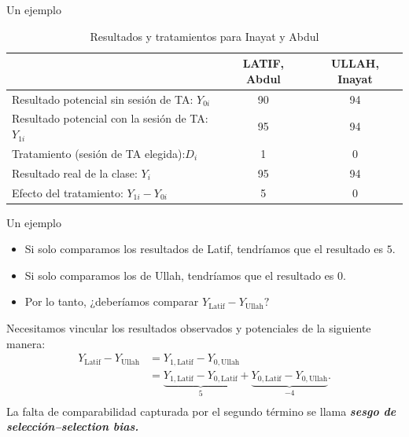 \documentclass[11pt, aspectratio=169, compress]{beamer}
\begin{document}
\begin{frame}{Un ejemplo}
  \begin{table}[H]
  \centering 
    \begin{threeparttable}
    \caption{Resultados y tratamientos para Inayat y Abdul}
    \small 
    \begin{tabular}{l c c} \hline \hline 
                              &LATIF, Abdul 	& ULLAH, Inayat \\ \hline
    Resultado potencial sin sesión de TA: $ Y_{0i} $	& 90	& 94  	\\
    Resultado potencial con la sesión de TA: $ Y_{1i}$ 	& 95	& 94  	\\
    Tratamiento (sesión de TA elegida):$ D_i $			& 1		& 0 	\\
    Resultado real de la clase: $ Y_{i} $				& 95	& 94   	\\ 
    Efecto del tratamiento: $ Y_{1i} - Y_{0i} $			& 5		& 0  	\\ \hline 
    \end{tabular}
    \end{threeparttable}
  \end{table}
\end{frame}
\begin{frame}{Un ejemplo}
\begin{itemize}
\item Si solo comparamos los resultados de Latif, tendríamos que el resultado es $ 5 $. 
\item Si solo comparamos los de Ullah, tendríamos que el resultado es $ 0 $.
\item Por lo tanto, ¿deberíamos comparar $ Y_{\mathrm{Latif}} - Y_{\mathrm{Ullah}} ? $
\end{itemize}

Necesitamos vincular los resultados observados y potenciales de la siguiente manera:
\begin{align*}
Y_{\mathrm{Latif}} - Y_{\mathrm{Ullah}} &= Y_{1,\mathrm{Latif}} - Y_{0,\mathrm{Ullah}} \\ 
&= \underbrace{Y_{1,\mathrm{Latif}} - Y_{0,\mathrm{Latif}}}_{5} + \underbrace{Y_{0,\mathrm{Latif}} - Y_{0,\mathrm{Ullah}}}_{-4}. \\ 
\end{align*}
La falta de comparabilidad capturada por el segundo término se llama \textit{\textbf{sesgo de selección--selection bias.}}
\end{frame}
\end{document}
